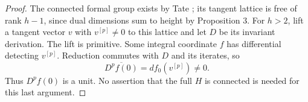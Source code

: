 \begin{proof}
The connected formal group exists by Tate \cite[\S2.2, Proposition 1, p.~162 and (4), p.~164]{Tate67}; its tangent lattice is free of rank $h-1$, since dual dimensions sum to height by Proposition 3. For $h>2$, lift a tangent vector $v$ with $v^{[p]}\ne0$ to this lattice and let $D$ be its invariant derivation. The lift is primitive. Some integral coordinate $f$ has differential detecting $v^{[p]}$. Reduction commutes with $D$ and its iterates, so
\[
 \overline{D^pf(0)}=df_0(v^{[p]})\ne0.
\]
Thus $D^pf(0)$ is a unit. No assertion that the full $H$ is connected is needed for this last argument.
\end{proof}
